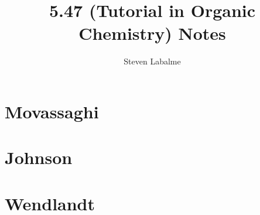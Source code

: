 \documentclass{report}
\title{5.47 (Tutorial in Organic Chemistry) Notes}
\author{Steven Labalme}
\renewcommand{\chaptername}{Problem Set}
\begin{document}
\maketitle



\tableofcontents
\listoffigures
\newpage



\pagestyle{main}
\renewcommand{\chaptermark}[1]{\markboth{\chaptername\ \thechapter\ (#1)}{}}
\part{Movassaghi}






\part{Johnson}


\part{Wendlandt}




\printbibliography[heading=bibintoc]
\end{document}
